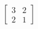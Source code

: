 \documentclass[preview]{standalone}
\begin{document}
\begin{align*}
\begin{bmatrix} 3 & 2 \\ 2 & 1 \end{bmatrix}
\end{align*}
\end{document}

